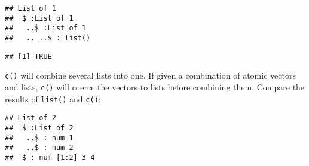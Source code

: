 \begin{Shaded}
\begin{Highlighting}[]
\StringTok{ }\NormalTok{(}\NormalTok{(}\NormalTok{(}\NormalTok{())))}
\end{Highlighting}
\end{Shaded}

\begin{verbatim}
## List of 1
##  $ :List of 1
##   ..$ :List of 1
##   .. ..$ : list()
\end{verbatim}

\begin{Shaded}
\begin{Highlighting}[]
\end{Highlighting}
\end{Shaded}

\begin{verbatim}
## [1] TRUE
\end{verbatim}

\texttt{c()} will combine several lists into one. If given a combination
of atomic vectors and lists, \texttt{c()} will coerce the vectors to
lists before combining them. Compare the results of \texttt{list()} and
\texttt{c()}:

\begin{Shaded}
\begin{Highlighting}[]
\StringTok{ }\NormalTok{(}\NormalTok{(}\NormalTok{, }\NormalTok{), }\NormalTok{(}\NormalTok{, }\NormalTok{))}
\StringTok{ }\NormalTok{(}\NormalTok{(}\NormalTok{, }\NormalTok{), }\NormalTok{(}\NormalTok{, }\NormalTok{))}
\end{Highlighting}
\end{Shaded}

\begin{verbatim}
## List of 2
##  $ :List of 2
##   ..$ : num 1
##   ..$ : num 2
##  $ : num [1:2] 3 4
\end{verbatim}

\begin{Shaded}
\begin{Highlighting}[]
\end{Highlighting}
\end{Shaded}

